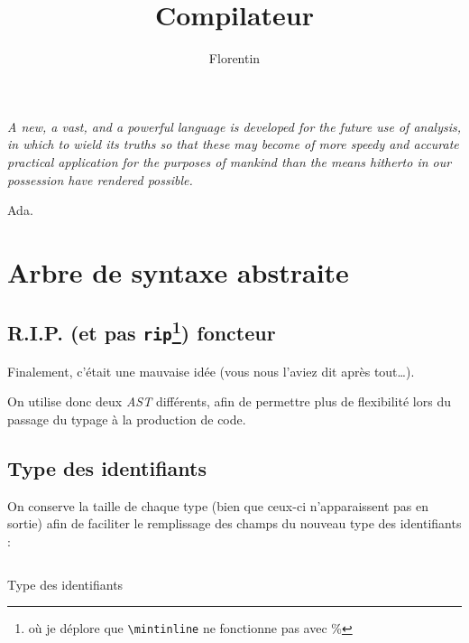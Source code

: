 \documentclass[a4paper, 10pt, french]{article}
\title{Compilateur  \foreign{Mini Ada}}
\author{Florentin \bsc{Guth}}
\newcommand{\codeASM}[1]{\texttt{#1}}
\newcommand{\code}[1]{\texttt{#1}}
\newcommand{\foreign}{\emph}
\begin{document}
\maketitle

\begin{table}[h]
  \parbox{.3\linewidth}{}
  \hfill
  \parbox{.7\linewidth}{
    \begin{flushright}
      \emph{A new, a vast, and a powerful language is developed for the future use of analysis, in which to wield its truths so that these may become of more speedy and accurate practical application for the purposes of mankind than the means hitherto in our possession have rendered possible.}
      
      Ada.
    \end{flushright}}
\end{table}

\tableofcontents

\clearpage
\section{Arbre de syntaxe abstraite}

\subsection{R.I.P. (et pas \codeASM{rip}\footnote{où je déplore que \code{\textbackslash mintinline} ne fonctionne pas avec \%}) foncteur}

Finalement, c'était une mauvaise idée (vous nous l'aviez dit après tout\ldots). 

On utilise donc deux \foreign{AST} différents, afin de permettre plus de flexibilité lors du passage du typage à la production de code.


\subsection{Type des identifiants}

On conserve la taille de chaque type (bien que ceux-ci n'apparaissent pas en sortie) afin de faciliter le remplissage des champs du nouveau type des identifiants :
\begin{table}[H]
 \inputminted[frame=lines,linenos,style=colorful,fontfamily=tt,breaklines,autogobble,firstline=50,firstnumber=50,lastline=56,label={ast\_typed.ml[50--56]}]{OCaml}{../ast_typed.ml}
  \caption{Type des identifiants}
\end{table}
\end{document}
